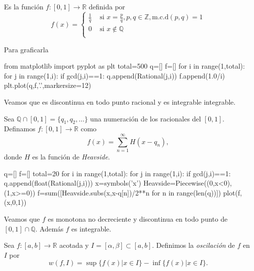 \begin{ejemplo}{} Es la función $f:[0,1]\to\mathbb{R}$ definida por 
\[
 f(x)=\begin{cases} \frac{1}{q} & \text{ si } x=\frac{p}{q},p,q\in\mathbb{Z}, \text{m.c.d}(p,q)=1
 \\0 & \text{ si }   x\notin\mathbb{Q}\\
\end{cases}
\]
\end{ejemplo}

Para graficarla

\begin{sympyverbatim}
from matplotlib import pyplot as plt
total=500
q=[]
f=[]
for i in range(1,total):
    for j in range(1,i):
        if gcd(j,i)==1:
            q.append(Rational(j,i))
            f.append(1.0/i)
plt.plot(q,f,'.',markersize=12)
\end{sympyverbatim}

Veamos que es discontinua en todo punto racional y es integrable integrable.

\begin{ejemplo}{} Sea $\mathbb{Q}\cap [0,1]=\{q_1,q_2,\ldots\}$ una numeración de los racionales del $[0,1]$. Definamos $f:[0,1]\to\mathbb{R}$ como
 \[
  f(x)=\sum_{n=1}^{\infty}H(x-q_n),
 \]
donde $H$ es la función de \emph{Heavside}. 
\begin{sympyverbatim}
q=[]
f=[]
total=20
for i in range(1,total):
    for j in range(1,i):
        if gcd(j,i)==1:
            q.append(float(Rational(j,i)))
x=symbols('x')
Heavside=Piecewise((0,x<0),(1,x>=0))
f=sum([Heavside.subs(x,x-q[n])/2**n for n in range(len(q))])
plot(f,(x,0,1))
\end{sympyverbatim}

Veamos que $f$ es monotona no decreciente y discontinua en todo punto de $[0,1]\cap \mathbb{Q}$. Además $f$ es integrable.


\end{ejemplo}
\begin{definicion}{} Sea $f:[a,b]\to\mathbb{R}$ acotada y $I=[\alpha,\beta]\subset [a,b]$. Definimos la \emph{oscilación} de $f$ en $I$ por 
\[
 w(f,I)=\sup\{f(x)| x\in I\}-\inf\{f(x)| x\in I\}.
\]
\end{definicion}

